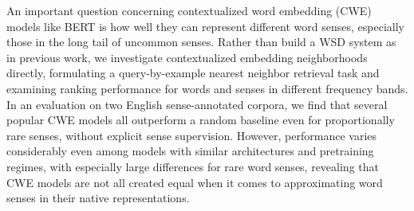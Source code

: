 An important question concerning contextualized word embedding (CWE) models like BERT is how well they can represent different word senses, especially those in the long tail of uncommon senses. Rather than build a WSD system as in previous work, we investigate contextualized embedding neighborhoods directly, formulating a query-by-example nearest neighbor retrieval task and examining ranking performance for words and senses in different frequency bands. In an evaluation on two English sense-annotated corpora, we find that several popular CWE models all outperform a random baseline even for proportionally rare senses, without explicit sense supervision. However, performance varies considerably even among models with similar architectures and pretraining regimes, with especially large differences for rare word senses, revealing that CWE models are not all created equal when it comes to approximating word senses in their native representations.
